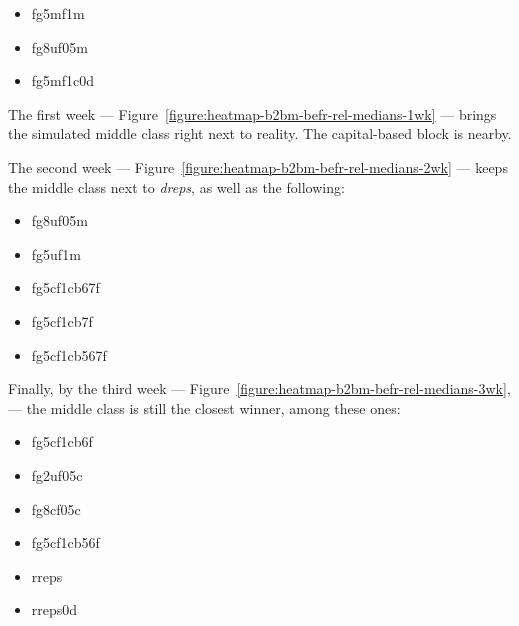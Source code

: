 \documentclass[10pt,oneside]{memoir}
\begin{document}
\begin{Spacing}{2}
\begin{itemize}
\item fg5mf1m

\item fg8uf05m

\item fg5mf1c0d
\end{itemize}

The first week --- Figure~\ref{figure:heatmap-b2bm-befr-rel-medians-1wk} ---   brings the simulated middle class right next to reality.  The capital-based block is nearby.


The second week --- Figure~\ref{figure:heatmap-b2bm-befr-rel-medians-2wk} ---  keeps the middle class next to {\itshape dreps}, as well as the following:


\begin{itemize}


\item fg8uf05m

\item fg5uf1m

\item fg5cf1cb67f

\item fg5cf1cb7f

\item fg5cf1cb567f
\end{itemize}

Finally, by the third week --- Figure~\ref{figure:heatmap-b2bm-befr-rel-medians-3wk}, ---  the middle class is still the closest winner, among these ones:


\begin{itemize}


\item fg5cf1cb6f

\item fg2uf05c

\item fg8cf05c

\item fg5cf1cb56f

\item rreps

\item rreps0d
\end{itemize}



\end{Spacing}
\end{document}
